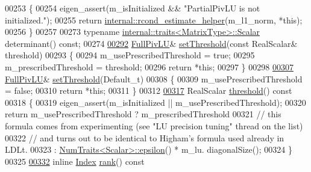 \begin{DoxyCode}
00253 \textcolor{keyword}{    }\{
00254       eigen\_assert(m\_isInitialized && \textcolor{stringliteral}{"PartialPivLU is not initialized."});
00255       \textcolor{keywordflow}{return} \hyperlink{namespace_eigen_1_1internal_ad1de0d785387bfb5435c410bf0554068}{internal::rcond\_estimate\_helper}(m\_l1\_norm, *\textcolor{keyword}{this});
00256     \}
00257 
00273     \textcolor{keyword}{typename} \hyperlink{struct_eigen_1_1internal_1_1traits}{internal::traits<MatrixType>::Scalar} determinant() \textcolor{keyword}{const};
00274 
\hyperlink{group___l_u___module_a414592d82de98f5bd075965caf56d681}{00292}     \hyperlink{group___l_u___module_class_eigen_1_1_full_piv_l_u}{FullPivLU}& \hyperlink{group___l_u___module_a414592d82de98f5bd075965caf56d681}{setThreshold}(\textcolor{keyword}{const} RealScalar& threshold)
00293     \{
00294       m\_usePrescribedThreshold = \textcolor{keyword}{true};
00295       m\_prescribedThreshold = threshold;
00296       \textcolor{keywordflow}{return} *\textcolor{keyword}{this};
00297     \}
00298 
\hyperlink{group___l_u___module_a1b5e30add3dfb6625da1213d68418f44}{00307}     \hyperlink{group___l_u___module_class_eigen_1_1_full_piv_l_u}{FullPivLU}& \hyperlink{group___l_u___module_a1b5e30add3dfb6625da1213d68418f44}{setThreshold}(Default\_t)
00308     \{
00309       m\_usePrescribedThreshold = \textcolor{keyword}{false};
00310       \textcolor{keywordflow}{return} *\textcolor{keyword}{this};
00311     \}
00312 
\hyperlink{group___l_u___module_ad77539203694f2d85ff7d11616e5a0a5}{00317}     RealScalar \hyperlink{group___l_u___module_ad77539203694f2d85ff7d11616e5a0a5}{threshold}()\textcolor{keyword}{ const}
00318 \textcolor{keyword}{    }\{
00319       eigen\_assert(m\_isInitialized || m\_usePrescribedThreshold);
00320       \textcolor{keywordflow}{return} m\_usePrescribedThreshold ? m\_prescribedThreshold
00321       \textcolor{comment}{// this formula comes from experimenting (see "LU precision tuning" thread on the list)}
00322       \textcolor{comment}{// and turns out to be identical to Higham's formula used already in LDLt.}
00323                                       : \hyperlink{group___core___module_struct_eigen_1_1_num_traits}{NumTraits<Scalar>::epsilon}() * m\_lu.
      diagonalSize();
00324     \}
00325 
\hyperlink{group___l_u___module_a67a870aa69e699e058d04802ba0bdad9}{00332}     \textcolor{keyword}{inline} \hyperlink{group___core___module_a554f30542cc2316add4b1ea0a492ff02}{Index} \hyperlink{group___l_u___module_a67a870aa69e699e058d04802ba0bdad9}{rank}()\textcolor{keyword}{ const}

\end{DoxyCode}
